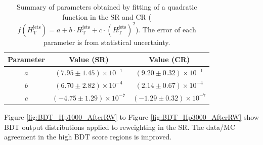 \begin{table}[H]
  \centering
  \begin{tabular*}{120mm}{c|c|c}
    \hline\hline
    Parameter & Value (SR)                      & Value (CR)\\
    \hline
    $a$       & $( 7.95{\pm}1.45)\times10^{-1}$ & $( 9.20{\pm}0.32)\times10^{-1}$\\
    \hline
    $b$       & $( 6.70{\pm}2.82)\times10^{-4}$ & $( 2.14{\pm}0.67)\times10^{-4}$\\
    \hline
    $c$       & $(-4.75{\pm}1.29)\times10^{-7}$ & $(-1.29{\pm}0.32)\times10^{-7}$\\
    \hline\hline
  \end{tabular*}
  \caption{Summary of parameters obtained by fitting of a quadratic function in the SR and CR ($f(H_{\text{T}}^{\text{jets}}) = a + b \cdot H_{\text{T}}^{\text{jets}} + c \cdot (H_{\text{T}}^{\text{jets}})^{2}$). The error of each parameter is from statistical uncertainty.}
  \label{tab:ParameterOfReweightingFunction}
\end{table}


Figure \ref{fig:BDT_Hp1000_AfterRW} to Figure \ref{fig:BDT_Hp3000_AfterRW} show BDT output distributions applied to reweighting in the SR. The data/MC agreement in the high BDT score regions is improved.

